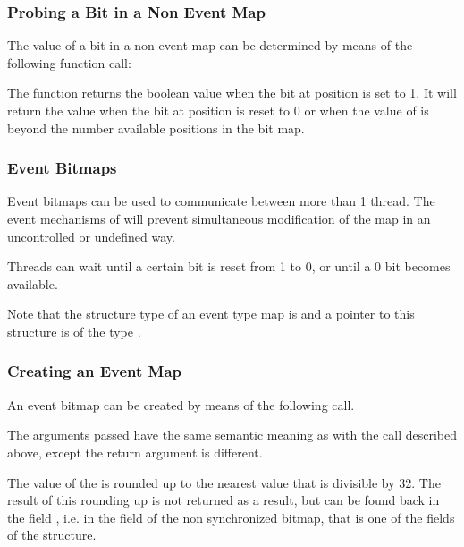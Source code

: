 
\subsubsection{Probing a Bit in a Non Event Map}

The value of a bit in a non event map can be determined by means of the
following function call:


The function returns the boolean value  when the bit at
position  is set to 1. It will return the value 
when the bit at position  is reset to 0 or when the value of
 is beyond the number available positions in the bit map.

\subsubsection{Event Bitmaps}

Event bitmaps can be used to communicate between more than 1 thread. The
event mechanisms of \oswald will prevent simultaneous modification of the map
in an uncontrolled or undefined way.

Threads can wait until a certain bit is reset from 1 to 0, or until a 0
bit becomes available. 

Note that the structure type of an event type map is  and a
pointer to this structure is of the type .

\subsubsection{Creating an Event Map} 

An event bitmap can be created by means of the following call.


The arguments passed have the same semantic meaning as with the
 call described above, except the return argument is
different. 

The value of the  is rounded up to the nearest value that is
divisible by 32. The result of this rounding up is not returned as a result,
but can be found back in the field ,
i.e. in the  field of the non synchronized bitmap, that is
one of the fields of the  structure.

